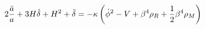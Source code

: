 \begin{equation}\label{einstein33}
  2\frac{\ddot{a}}{a}+3H\dot{\delta}+H^2+\ddot{\delta}=- \kappa \left(\dot{\phi}^2 -V +
\beta^4 \rho_R +{1\over 2} \beta^4 \rho_M \right)
\end{equation}

